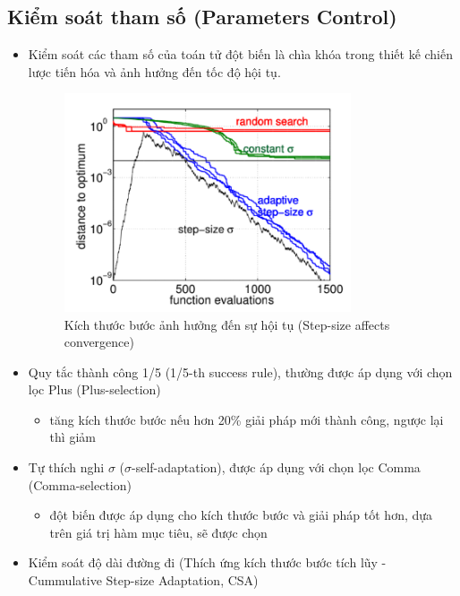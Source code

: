 \documentclass{book}
\begin{document}
\subsection{Kiểm soát tham số (Parameters Control)}
\begin{itemize}
    \item Kiểm soát các tham số của toán tử đột biến là chìa khóa trong thiết kế chiến lược tiến hóa và ảnh hưởng đến tốc độ hội tụ.
    \begin{figure}[H]
        \centering
        \includegraphics[width=0.8\textwidth]{images/step_size_effect_convergence.png}
        \caption{Kích thước bước ảnh hưởng đến sự hội tụ (Step-size affects convergence)}
        \label{fig:step_size_effect_convergence}
    \end{figure}
    \item Quy tắc thành công 1/5 (1/5-th success rule), thường được áp dụng với chọn lọc Plus (Plus-selection)
    \begin{itemize}[nosep]
        \item tăng kích thước bước nếu hơn 20\% giải pháp mới thành công, ngược lại thì giảm
    \end{itemize}
    \vspace{-0.1cm}
    \item Tự thích nghi $\sigma$ ($\sigma$-self-adaptation), được áp dụng với chọn lọc Comma (Comma-selection)
    \begin{itemize}[nosep]
        \item đột biến được áp dụng cho kích thước bước và giải pháp tốt hơn, dựa trên giá trị hàm mục tiêu, sẽ được chọn
    \end{itemize}
    \item Kiểm soát độ dài đường đi (Thích ứng kích thước bước tích lũy - Cummulative Step-size Adaptation, CSA)

\end{itemize}
\end{document}
